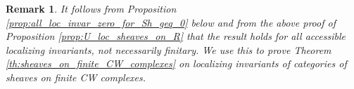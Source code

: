 \documentclass[11pt,leqno]{amsart}
\newtheorem{remark}[theo]{Remark}
\numberwithin{equation}{section}
\def\R{\mathbb{R}}
\newcommand{\Cat}{\operatorname{Cat}}
\newcommand{\loc}{\operatorname{loc}}
\newcommand{\cont}{\operatorname{cont}}
\newcommand{\st}{\operatorname{st}}
\newcommand{\dual}{\operatorname{dual}}
\newcommand{\cU}{{\mathcal U}}
\newcommand{\Sh}{\operatorname{Shv}}
\newcommand{\Sp}{\operatorname{Sp}}
\begin{document}


\begin{remark}It follows from Proposition \ref{prop:all_loc_invar_zero_for_Sh_geq_0} below and from the above proof of Proposition \ref{prop:U_loc_sheaves_on_R} that the result holds for all accessible localizing invariants, not necessarily finitary. We use this to prove Theorem \ref{th:sheaves_on_finite_CW_complexes} on localizing invariants of categories of sheaves on finite CW complexes.\end{remark}
\end{document}
